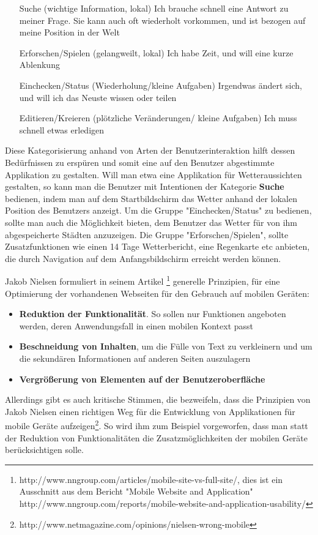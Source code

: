 \begin{itemize}
 	\item[Suche (wichtige Information, lokal)] Ich brauche schnell eine Antwort zu meiner Frage. Sie kann auch oft wiederholt vorkommen, und ist bezogen auf meine Position in der Welt
 	\item[Erforschen/Spielen (gelangweilt, lokal)] Ich habe Zeit, und will eine kurze Ablenkung
 	\item[Einchecken/Status (Wiederholung/kleine Aufgaben)] Irgendwas ändert sich, und will ich das Neuste wissen oder teilen
 	\item[Editieren/Kreieren (plötzliche Veränderungen/ kleine Aufgaben)] Ich muss schnell etwas erledigen
 \end{itemize} 

Diese Kategorisierung anhand von Arten der Benutzerinteraktion hilft dessen Bedürfnissen zu erspüren und somit eine auf den Benutzer abgestimmte Applikation zu gestalten. Will man etwa eine Applikation für Wetteraussichten gestalten, so kann man die Benutzer mit Intentionen der Kategorie \textbf{Suche} bedienen, indem man auf dem Startbildschirm das Wetter anhand der lokalen Position des Benutzers anzeigt. Um die Gruppe "Einchecken/Status" zu bedienen, sollte man auch die Möglichkeit bieten, dem Benutzer das Wetter für von ihm abgespeicherte Städten anzuzeigen. Die Gruppe "Erforschen/Spielen", sollte Zusatzfunktionen wie einen 14 Tage Wetterbericht, eine Regenkarte etc anbieten, die durch Navigation auf dem Anfangsbildschirm erreicht werden können.



Jakob Nielsen formuliert in seinem Artikel \footnote{http://www.nngroup.com/articles/mobile-site-vs-full-site/, dies ist ein  Ausschnitt aus dem Bericht "Mobile Website and Application" http://www.nngroup.com/reports/mobile-website-and-application-usability/} generelle Prinzipien, für eine Optimierung der vorhandenen Webseiten für den Gebrauch auf mobilen Geräten:
\begin{itemize}
	\item \textbf{Reduktion der Funktionalität}. So sollen nur Funktionen angeboten werden, deren Anwendungsfall in einen mobilen Kontext passt
	\item \textbf{Beschneidung von Inhalten}, um die Fülle von Text zu verkleinern und um die sekundären Informationen auf anderen Seiten auszulagern
	\item \textbf{Vergrößerung von Elementen auf der Benutzeroberfläche}
\end{itemize}
Allerdings gibt es auch kritische Stimmen, die bezweifeln, dass die Prinzipien von Jakob Nielsen einen richtigen Weg für die Entwicklung von Applikationen für mobile Geräte aufzeigen\footnote{http://www.netmagazine.com/opinions/nielsen-wrong-mobile}. So wird ihm zum Beispiel vorgeworfen, dass man statt der Reduktion von Funktionalitäten die Zusatzmöglichkeiten der mobilen Geräte berücksichtigen solle. 


